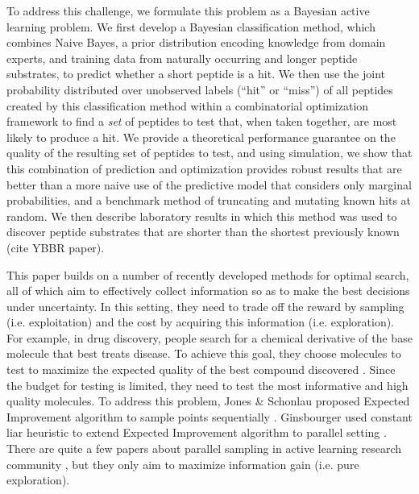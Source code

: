 \documentclass[opre,nonblindrev]{informs3} %
\begin{document}

To address this challenge, we formulate this problem as a Bayesian active learning problem.  We first develop a Bayesian classification method, which combines Naive Bayes, a prior distribution encoding knowledge from domain experts, and training data from naturally occurring and longer peptide substrates, to predict whether a short peptide is a hit. We then use the joint probability distributed over unobserved labels (``hit'' or ``miss'') of all peptides created by this classification method within a combinatorial optimization framework to find a {\it set} of peptides to test that, when taken together, are most likely to produce a hit.  We provide a theoretical performance guarantee on the quality of the resulting set of peptides to test, and using simulation, we show that this combination of prediction and optimization provides robust results that are better than a more naive use of the predictive model that considers only marginal probabilities, and a benchmark method of truncating and mutating known hits at random. We then describe laboratory results in which this method was used to discover peptide substrates that are shorter than the shortest previously known (cite YBBR paper).



This paper builds on a number of recently developed methods for optimal search, all of which aim to effectively collect information so as to make the best decisions under uncertainty. In this setting, they need to trade off the reward by sampling (i.e. exploitation) and the cost by acquiring this information (i.e. exploration). For example, in drug discovery, people search for a chemical derivative of the base molecule that best treats disease. To achieve this goal, they choose molecules to test to maximize the expected quality of the
best compound discovered \citep{Negoescu2010}. Since the budget for testing is limited, they need to test the most informative and high quality molecules. To address this problem, Jones \& Schonlau proposed Expected Improvement algorithm to sample points sequentially \citep{Jones1998}. Ginsbourger used constant liar heuristic to extend Expected Improvement algorithm to parallel setting \citep{Ginsbourger2008}. There are quite a few papers about parallel sampling in active learning research
community \citep{Chen2013, Hoi2006, Hoi2006a} , but they only aim to maximize information gain (i.e. pure exploration).
\end{document}
